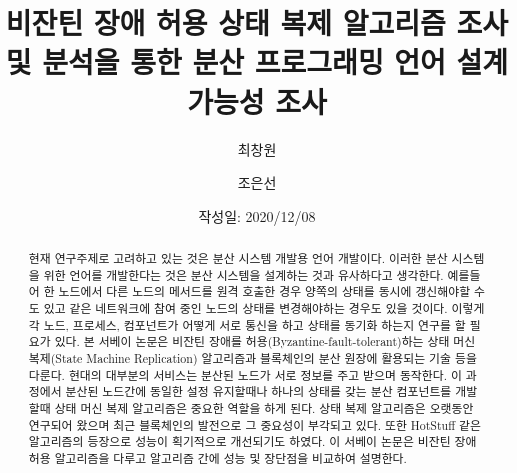 \documentclass[table,smallextended]{svjour3}       %
\begin{document}
\title{비잔틴 장애 허용 상태 복제 알고리즘 조사 및 분석을 통한 분산 프로그래밍 언어 설계 가능성 조사}


\author{최창원         \and
        조은선 %
}



\date{작성일: 2020/12/08}


\maketitle

\renewcommand{\abstractname}{초록}
\renewcommand{\refname}{참조}
\begin{abstract}
현재 연구주제로 고려하고 있는 것은 분산 시스템 개발용 언어 개발이다. 이러한 분산 시스템을 위한 언어를 개발한다는 것은
분산 시스템을 설계하는 것과 유사하다고 생각한다. 예를들어 한 노드에서 다른 노드의 메서드를 원격 호출한 경우 
양쪽의 상태를 동시에 갱신해야할 수도 있고 같은 네트워크에 참여 중인 노드의 상태를 변경해야하는 경우도 있을 것이다.
이렇게 각 노드, 프로세스, 컴포넌트가 어떻게 서로 통신을 하고 상태를 동기화 하는지 연구를 할 필요가 있다.
본 서베이 논문은 비잔틴 장애를 허용(Byzantine-fault-tolerant)하는 
상태 머신 복제(State Machine Replication) 알고리즘과 블록체인의 분산 원장에 활용되는 기술 등을 다룬다. 
현대의 대부분의 서비스는 분산된 노드가 서로 정보를 주고 받으며 동작한다.
이 과정에서 분산된 노드간에 동일한 설정 유지할때나 하나의 상태를 갖는 분산 컴포넌트를 개발할때
상태 머신 복제 알고리즘은 중요한 역할을 하게 된다. 상태 복제 알고리즘은 오랫동안 연구되어 왔으며 최근 블록체인의
발전으로 그 중요성이 부각되고 있다. 또한 HotStuff 같은 알고리즘의 등장으로 성능이 획기적으로
개선되기도 하였다. 이 서베이 논문은 비잔틴 장애 허용 알고리즘을 다루고
알고리즘 간에 성능 및 장단점을 비교하여 설명한다.

\end{abstract}
\end{document}
